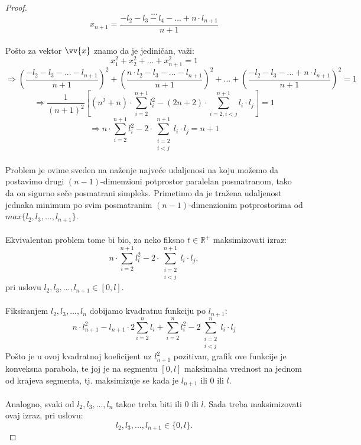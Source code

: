 \documentclass[11pt,letter]{article}
\begin{document}
\begin{proof}
\vspace{3pt}
$$...$$
\vspace{3pt}
$$x_{n+1}=\frac{-l_2-l_3-l_4-...+n\cdot l_{n+1}}{n+1}$$
\\
\indent Po\v sto za vektor $\vv{x}$ znamo da je jedini\v can, va\v zi:
$$x_1^2+ x_2^2+...+x_{n+1}^2=1$$
$$\Rightarrow \left(\frac{-l_2-l_3-...-l_{n+1}}{n+1}\right)^2+\left(\frac{n\cdot l_2-l_3-...-l_{n+1}}{n+1}\right)^2+...+\left(\frac{-l_2-l_3-...+n\cdot l_{n+1}}{n+1}\right)^2=1$$
$$\Rightarrow \frac{1}{(n+1)^2}\left[ (n^2+n)\cdot {\sum_{i=2}^{n+1} {l_i^2}} - (2n+2)\cdot {\sum_{i=2, i<j}^{n+1} {l_i\cdot l_j} } \right]=1$$
$$\Rightarrow n\cdot {\sum_{i=2}^{n+1} {l_i^2}} - 2\cdot {\sum_{\substack{ i=2\\ i<j}}^{n+1} {l_i\cdot l_j} } =n+1$$
\\





\indent Problem je ovime sveden na na\v zenje najve\' ce udaljenosi na koju mo\v zemo da postavimo drugi $(n-1)$-dimenzioni potprostor paralelan posmatranom, tako da on sigurno se\v ce posmatrani simpleks. Primetimo da je tra\v zena udaljenost jednaka minimum po svim posmatranim $(n-1)$-dimenzionim potprostorima od $max\{l_2, l_3,..., l_{n+1}\}$.
\\
\\
\indent Ekvivalentan problem tome bi bio, za neko fiksno $t\in \mathbb{R}^+$ maksimizovati izraz:
$$n\cdot {\sum_{i=2}^{n+1} {l_i^2}} - 2\cdot {\sum_{\substack{ i=2\\ i<j}}^{n+1} {l_i\cdot l_j} }, $$
pri uslovu $l_2,l_3,..., l_{n+1}\in [0,l]$.
\\
\\
\indent Fiksiranjem $l_2, l_3,..., l_n$ dobijamo kvadratnu funkciju po $l_{n+1}$:
$$n\cdot l_{n+1}^2-l_{n+1}\cdot 2\sum^{n}_{i=2}l_i+\sum^{n}_{i=2}l_i^2-2\sum^{n}_{\substack{ i=2\\ i<j}}l_i\cdot l_j$$
\indent Po\v sto je u ovoj kvadratnoj koeficijent uz $l_{n+1}^2$ pozitivan, grafik ove funkcije je konveksna parabola, te joj je na segmentu $[0,l]$ maksimalna vrednost na jednom od krajeva segmenta, tj. maksimizuje se kada je $l_{n+1}$ ili 0 ili $l$.
\\
\\
\indent Analogno, svaki od $l_2, l_3,..., l_n$ tako\dj e treba biti ili 0 ili $l$. Sada treba maksimizovati ovaj izraz, pri uslovu:
$$l_2, l_3,..., l_{n+1}\in \{0, l\}.$$


\end{proof}
\end{document}
